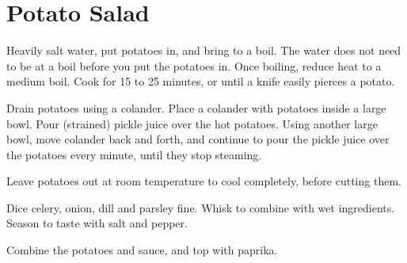 \section{Potato Salad}
\begin{recipe}



Heavily salt water, put potatoes in, and bring to a boil. The water does not need to 
be at a boil before you put the potatoes in. Once boiling, reduce heat to a 
medium boil. Cook for 15 to 25 minutes, or until a knife easily pierces a potato. 

Drain potatoes using a colander. Place a colander with potatoes inside a large bowl. 
Pour (strained) pickle juice over the hot potatoes. Using another large bowl, move 
colander back and forth, and continue to pour the pickle juice over the potatoes every 
minute, until they stop steaming.

Leave potatoes out at room temperature to cool completely, before cutting them. 


Dice celery, onion, dill and parsley fine. Whisk to combine with wet ingredients.
Season to taste with salt and pepper.


Combine the potatoes and sauce, and top with paprika.

\end{recipe}
